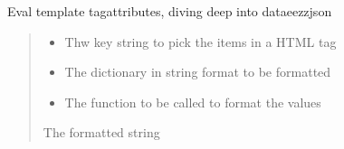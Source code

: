 \documentclass[letterpaper,10pt,english]{sphinxmanual}
\begin{document}
\begin{savenotes}
\begin{fulllineitems}

\begin{savenotes}\begin{fulllineitems}
\label{\detokenize{eezz:eezz.http_agent.THttpAgent.format_attributes}}
\pysigstartsignatures
{}
\pysigstopsignatures
\sphinxAtStartPar
Eval template tag\sphinxhyphen{}attributes, diving deep into data\sphinxhyphen{}eezz\sphinxhyphen{}json
\begin{quote}\begin{description}
\begin{itemize}
\item {} 
\sphinxAtStartPar
{} \textendash{} Thw key string to pick the items in a HTML tag

\item {} 
\sphinxAtStartPar
{} \textendash{} The dictionary in string format to be formatted

\item {} 
\sphinxAtStartPar
{} \textendash{} The function to be called to format the values

\end{itemize}

\sphinxAtStartPar
The formatted string

\end{description}\end{quote}

\end{fulllineitems}\end{savenotes}



\end{fulllineitems}
\end{savenotes}
\end{document}
